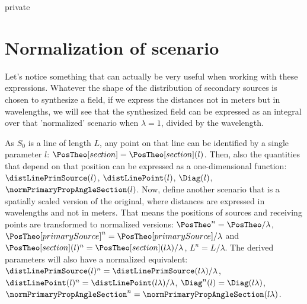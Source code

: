 \begin{shownto}{private}
\section*{Normalization of scenario}
Let's notice something that can actually be very useful when working with these expressions. Whatever the shape of the distribution of secondary sources is chosen to synthesize a field, if we express the distances not in meters but in wavelengths, we will see that the synthesized field can be expressed as an integral over that 'normalized' scenario when $\lambda = 1$, divided by the wavelength.

As $S_0$ is a line of length $L$, any point on that line can be identified by a single parameter $l$: $\PosTheo[section] = \PosTheo[section](l)$. Then, also the quantities that depend on that position can be expressed as a one-dimensional function: $\distLinePrimSource(l)$, $\distLinePoint(l)$, $\Diag(l)$, $\normPrimaryPropAngleSection(l)$. Now, define another scenario that is a spatially scaled version of the original, where distances are expressed in wavelengths and not in meters. That means the positions of sources and receiving points are transformed to normalized versions: $\PosTheo^{n} = \PosTheo/\lambda$, $\PosTheo[primarySource]^{n} = \PosTheo[primarySource]/\lambda$ and $\PosTheo[section](l)^{n} = \PosTheo[section](l\lambda)/\lambda$, $L^{n} = L/\lambda$. The derived parameters will also have a normalized equivalent: $\distLinePrimSource(l)^{n} = \distLinePrimSource(l\lambda)/\lambda$, $\distLinePoint(l)^{n} = \distLinePoint(l\lambda)/\lambda$, $\Diag^{n}(l) = \Diag(l\lambda)$, $\normPrimaryPropAngleSection^{n} = \normPrimaryPropAngleSection(l\lambda)$.


\end{shownto}
